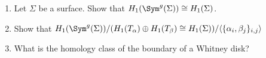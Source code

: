 

    \begin{enumerate}
            \item    Let $\Sigma$ be a surface. Show that $H_1(\Sym^g(\Sigma))\cong H_1(\Sigma)$.
            \item    Show that $H_1(\Sym^g(\Sigma))/(H_1(T_\alpha)\oplus H_1(T_\beta)\cong H_1(\Sigma))/\langle\{\alpha_i,\beta_j\}_{i,j}\rangle$
             \item   What is the homology class of the boundary of a Whitney disk?
    \end{enumerate}

